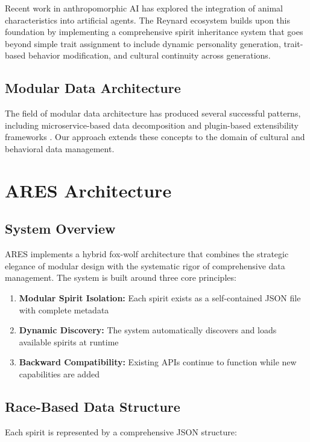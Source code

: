 \documentclass[11pt,a4paper]{article}
\begin{document}
Recent work in anthropomorphic AI has explored the integration of animal characteristics into artificial agents. The Reynard ecosystem builds upon this foundation by implementing a comprehensive spirit inheritance system that goes beyond simple trait assignment to include dynamic personality generation, trait-based behavior modification, and cultural continuity across generations.

\subsection{Modular Data Architecture}

The field of modular data architecture has produced several successful patterns, including microservice-based data decomposition \cite{microservices-data} and plugin-based extensibility frameworks \cite{plugin-architecture}. Our approach extends these concepts to the domain of cultural and behavioral data management.

\section{ARES Architecture}

\subsection{System Overview}

ARES implements a hybrid fox-wolf architecture that combines the strategic elegance of modular design with the systematic rigor of comprehensive data management. The system is built around three core principles:

\begin{enumerate}
    \item \textbf{Modular Spirit Isolation:} Each spirit exists as a self-contained JSON file with complete metadata
    \item \textbf{Dynamic Discovery:} The system automatically discovers and loads available spirits at runtime
    \item \textbf{Backward Compatibility:} Existing APIs continue to function while new capabilities are added
\end{enumerate}

\subsection{Race-Based Data Structure}

Each spirit is represented by a comprehensive JSON structure:
\end{document}
